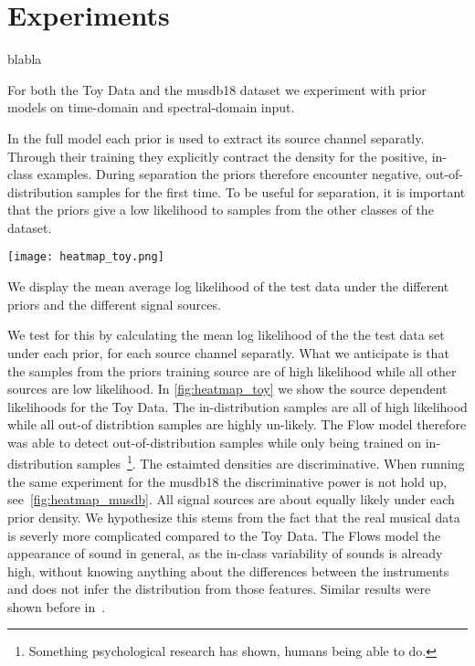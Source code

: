 \section{Experiments}

blabla

For both the Toy Data and the musdb18 dataset we experiment with prior models on time-domain and spectral-domain input.

In the full model each prior is used to extract its source channel separatly. Through their training they explicitly contract the density for the positive, in-class examples. During separation the priors therefore encounter negative, out-of-distribution samples for the first time. To be useful for separation, it is important that the priors give a low likelihood to samples from the other classes of the dataset.

\begin{marginfigure}
    \texttt{[image: heatmap\_toy.png]}%
    \caption{We display the mean average log likelihood of the test data under the different priors and the different signal sources.}%
    \label{fig:heatmap_toy}
\end{marginfigure}

We test for this by calculating the mean log likelihood of the the test data set under each prior, for each source channel separatly. What we anticipate is that the samples from the priors training source are of high likelihood while all other sources are low likelihood. In \cref{fig:heatmap_toy} we show the source dependent likelihoods for the Toy Data. The in-distribution samples are all of high likelihood while all out-of distribtion samples are highly un-likely. The Flow model therefore was able to detect out-of-distribution samples while only being trained on in-distribution samples~\footnote{Something psychological research has shown, humans being able to do.}. The estaimted densities are discriminative. When running the same experiment for the musdb18 the discriminative power is not hold up, see~\cref{fig:heatmap_musdb}. All signal sources are about equally likely under each prior density. We hypothesize this stems from the fact that the real musical data is severly more complicated compared to the Toy Data. The Flows model the appearance of sound in general, as the in-class variability of sounds is already high, without knowing anything about the  differences between the instruments and does not infer the distribution from those features. Similar results were shown before in~.

